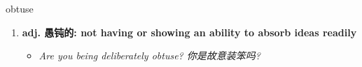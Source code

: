 
\begin{frame}
{\huge obtuse}
\begin{center}
\begin{enumerate}\Large
  \item \textbf{adj. 愚钝的: not having or showing an ability to absorb ideas readily}
  \begin{itemize}
    \item \em{\Large{Are you being deliberately obtuse? 你是故意装笨吗?}}
  \end{itemize}
\end{enumerate}
\end{center}
\end{frame}
